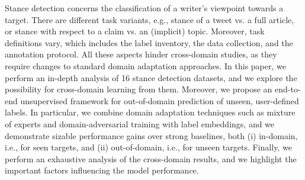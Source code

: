 Stance detection concerns the classification of a writer's viewpoint towards a target. There are different task variants, e.g., stance of a tweet vs. a full article, or stance with respect to a claim vs. an (implicit) topic. Moreover, task definitions vary, which includes the label inventory, the data collection, and the annotation protocol. All these aspects hinder cross-domain studies, as they require changes to standard domain adaptation approaches. In this paper, we perform an in-depth analysis of 16 stance detection datasets, and we explore the possibility for cross-domain learning from them. Moreover, we propose an end-to-end unsupervised framework for out-of-domain prediction of unseen, user-defined labels. In particular, we combine domain adaptation techniques such as mixture of experts and domain-adversarial training with label embeddings, and we demonstrate sizable performance gains over strong baselines, both (i) in-domain, i.e., for seen targets, and (ii) out-of-domain, i.e., for unseen targets. Finally, we perform an exhaustive analysis of the cross-domain results, and we highlight the important factors influencing the model performance.
